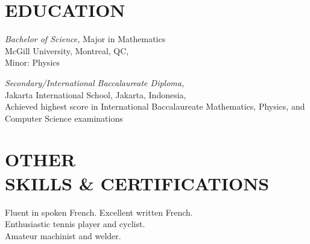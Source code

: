 \documentclass[line,margin]{res}
\begin{document}
\begin{resume}
\section{EDUCATION} {\sl Bachelor of Science,} Major in Mathematics \\
                McGill University, Montreal, QC,  \\
                Minor: Physics 
 
			{\sl Secondary/International Baccalaureate Diploma,} \\
                Jakarta International School,
                Jakarta, Indonesia,  \\
                Achieved highest score in International Baccalaureate Mathematics, Physics, and Computer Science examinations
                
\section{OTHER \\ SKILLS \& CERTIFICATIONS}             
Fluent in spoken French. Excellent written French. \\
Enthusiastic tennis player and cyclist. \\
Amateur machinist and welder.

\end{resume}
\end{document}
